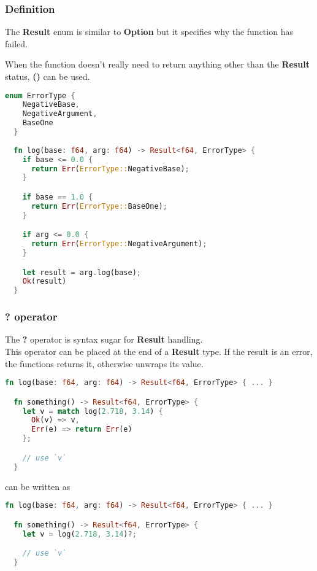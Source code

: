 \documentclass{article}
\begin{document}
\subsubsection{Definition}

The \textbf{Result} enum is similar to \textbf{Option} but it
specifies why the function has failed.

When the function doesn't really need to return anything other than the
\textbf{Result} status, \textbf{()} can be used.

\begin{lstlisting}[language=Rust, style=boxed, numbers=none]
  enum ErrorType {
    NegativeBase,
    NegativeArgument,
    BaseOne
  }
  
  fn log(base: f64, arg: f64) -> Result<f64, ErrorType> {
    if base <= 0.0 {
      return Err(ErrorType::NegativeBase);
    }

    if base == 1.0 {
      return Err(ErrorType::BaseOne);
    }

    if arg <= 0.0 {
      return Err(ErrorType::NegativeArgument);
    }

    let result = arg.log(base);
    Ok(result)
  }
\end{lstlisting}

\pagebreak

\subsubsection{? operator}

The \textbf{?} operator is syntax sugar for \textbf{Result} handling. \\
This operator can be placed at the end of a \textbf{Result} type.
If the result is an error, the functions returns it, otherwise unwraps
its value.

\begin{lstlisting}[language=Rust, style=boxed, numbers=none]
  fn log(base: f64, arg: f64) -> Result<f64, ErrorType> { ... }

  fn something() -> Result<f64, ErrorType> {
    let v = match log(2.718, 3.14) {
      Ok(v) => v,
      Err(e) => return Err(e)
    };

    // use `v`
  }
\end{lstlisting}

can be written as

\begin{lstlisting}[language=Rust, style=boxed, numbers=none]
  fn log(base: f64, arg: f64) -> Result<f64, ErrorType> { ... }

  fn something() -> Result<f64, ErrorType> {
    let v = log(2.718, 3.14)?;

    // use `v`
  }
\end{lstlisting}
\end{document}
